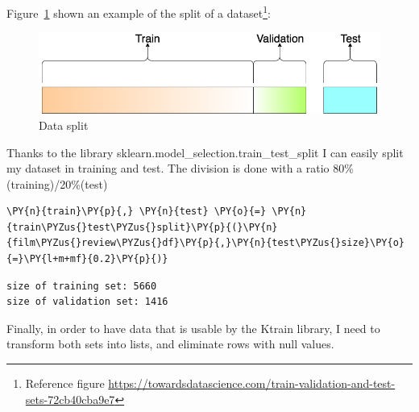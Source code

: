 Figure~\ref{fig:fig_06} shown an example of the split of a dataset\footnote{Reference figure \url{https://towardsdatascience.com/train-validation-and-test-sets-72cb40cba9e7}}: 
\begin{figure}[H]
\centering
\includegraphics[width=1\textwidth]{images/traintestvali.jpg}
\caption{Data split}
\label{fig:fig_06}
\end{figure}
\FloatBarrier

Thanks to the library sklearn.model\_selection.train\_test\_split I can easily split my dataset in training and test. The division is done with a ratio 80\%(training)/20\%(test)

    \begin{tcolorbox}[breakable, size=fbox, boxrule=1pt, pad at break*=1mm,colback=cellbackground, colframe=cellborder]
\begin{Verbatim}[commandchars=\\\{\},fontsize=\small]
\PY{n}{train}\PY{p}{,} \PY{n}{test} \PY{o}{=} \PY{n}{train\PYZus{}test\PYZus{}split}\PY{p}{(}\PY{n}{film\PYZus{}review\PYZus{}df}\PY{p}{,}\PY{n}{test\PYZus{}size}\PY{o}{=}\PY{l+m+mf}{0.2}\PY{p}{)}
\end{Verbatim}
\end{tcolorbox}

   \begin{Verbatim}[commandchars=\\\{\},fontsize=\small]
size of training set: 5660
size of validation set: 1416
    \end{Verbatim}

Finally, in order to have data that is usable by the Ktrain library, I need to transform both sets into lists, and eliminate rows with null values.